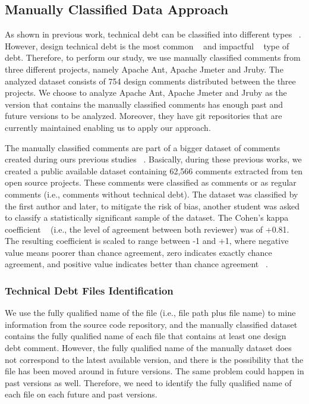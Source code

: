 \subsection*{Manually Classified Data Approach}
\label{sub:manually_classified_data_approach}

As shown in previous work, technical debt can be classified into different types ~\cite{Alves2014MTD}. However, design technical debt is the most common ~\cite{Maldonado2015MTD} and impactful ~\cite{Ernst2015FSE} type of debt. Therefore, to perform our study, we use manually classified \SATD comments from three different projects, namely Apache Ant, Apache Jmeter and Jruby. The analyzed dataset consists of 754 \SATD design comments distributed between the three projects. We choose to analyze Apache Ant, Apache Jmeter and Jruby as the version that contains the manually classified comments has enough past and future versions to be analyzed. Moreover, they have git repositories that are currently maintained enabling us to apply our approach. 

The manually classified comments are part of a bigger dataset of \SATD comments created during ours previous studies ~\cite{Maldonado2015MTD,Maldonado2015TSE}. Basically, during these previous works, we created a public available dataset containing 62,566 comments extracted from ten open source projects. These comments were classified as \SATD comments or as regular comments (i.e., comments without technical debt). The dataset was classified by the first author and later, to mitigate the risk of bias, another student was asked to classify a statistically significant sample of the dataset. The Cohen's kappa coefficient ~\cite{cohen1960coefficient} (i.e., the level of agreement between both reviewer) was of +0.81. The resulting coefficient is scaled to range between -1 and +1, where negative value means poorer than chance agreement, zero indicates exactly chance agreement, and positive value indicates better than chance agreement ~\cite{fleiss1973equivalence}.

\subsubsection*{Technical Debt Files Identification}
\label{subsub:technical_debt_files_identification}

We use the fully qualified name of the file (i.e., file path plus file name) to mine information from the source code repository, and the manually classified dataset contains the fully qualified name of each file that contains at least one \SATD design debt comment. However, the fully qualified name of the manually dataset does not correspond to the latest available version, and there is the possibility that the file has been moved around in future versions. The same problem could happen in past versions as well. Therefore, we need to identify the fully qualified name of each file on each future and past versions. 

